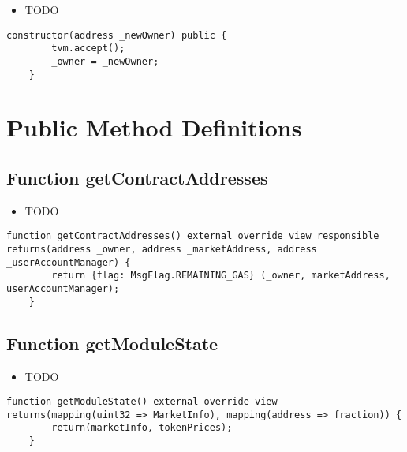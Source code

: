 \noindent\begin{itemize}
\item TODO
\end{itemize}

\begin{lstlisting}[firstnumber=18]
    constructor(address _newOwner) public {
        tvm.accept();
        _owner = _newOwner;
    }
\end{lstlisting}

\section{Public Method Definitions}


\subsection{Function getContractAddresses}

\noindent\begin{itemize}
\item TODO
\end{itemize}

\begin{lstlisting}[firstnumber=77]
    function getContractAddresses() external override view responsible returns(address _owner, address _marketAddress, address _userAccountManager) {
        return {flag: MsgFlag.REMAINING_GAS} (_owner, marketAddress, userAccountManager);
    }
\end{lstlisting}

\subsection{Function getModuleState}

\noindent\begin{itemize}
\item TODO
\end{itemize}

\begin{lstlisting}[firstnumber=61]
    function getModuleState() external override view returns(mapping(uint32 => MarketInfo), mapping(address => fraction)) {
        return(marketInfo, tokenPrices);
    }
\end{lstlisting}

